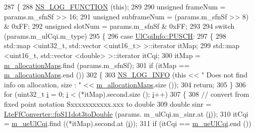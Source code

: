 \begin{DoxyCode}
287 \{
288   \hyperlink{log-macros-disabled_8h_a90b90d5bad1f39cb1b64923ea94c0761}{NS\_LOG\_FUNCTION} (\textcolor{keyword}{this});
289 
290         \textcolor{keywordtype}{unsigned} frameNum = params.m\_sfnSf >> 16;
291         \textcolor{keywordtype}{unsigned} subframeNum = (params.m\_sfnSf >> 8) & 0xFF;
292         \textcolor{keywordtype}{unsigned} slotNum = params.m\_sfnSf & 0xFF;
293 
294   \textcolor{keywordflow}{switch} (params.m\_ulCqi.m\_type)
295     \{
296     \textcolor{keywordflow}{case} \hyperlink{structns3_1_1UlCqiInfo_a8241de30e4fdc8640e892ddf1e2a6c00a6d4b515df7c45a6843584459fbde26a7}{UlCqiInfo::PUSCH}:
297       \{
298         std::map <uint32\_t, std::vector <uint16\_t> >::iterator itMap;
299         std::map <uint16\_t, std::vector <double> >::iterator itCqi;
300         itMap = \hyperlink{classns3_1_1MmWaveRrMacScheduler_aac1f8a8418e80a70a78e8fb710697588}{m\_allocationMaps}.find (params.m\_sfnSf);
301         \textcolor{keywordflow}{if} (itMap == \hyperlink{classns3_1_1MmWaveRrMacScheduler_aac1f8a8418e80a70a78e8fb710697588}{m\_allocationMaps}.end ())
302           \{
303             \hyperlink{group__logging_gafbd73ee2cf9f26b319f49086d8e860fb}{NS\_LOG\_INFO} (\textcolor{keyword}{this} << \textcolor{stringliteral}{" Does not find info on allocation, size : "} << 
      \hyperlink{classns3_1_1MmWaveRrMacScheduler_aac1f8a8418e80a70a78e8fb710697588}{m\_allocationMaps}.size ());
304             \textcolor{keywordflow}{return};
305           \}
306         \textcolor{keywordflow}{for} (uint32\_t \hyperlink{bernuolliDistribution_8m_a6f6ccfcf58b31cb6412107d9d5281426}{i} = 0; \hyperlink{bernuolliDistribution_8m_a6f6ccfcf58b31cb6412107d9d5281426}{i} < (*itMap).second.size (); \hyperlink{bernuolliDistribution_8m_a6f6ccfcf58b31cb6412107d9d5281426}{i}++)
307           \{
308             \textcolor{comment}{// convert from fixed point notation Sxxxxxxxxxxx.xxx to double}
309             \textcolor{keywordtype}{double} sinr = \hyperlink{classns3_1_1LteFfConverter_aa5d8c2a8f988dbd63da91818c18666eb}{LteFfConverter::fpS11dot3toDouble} (params.
      m\_ulCqi.m\_sinr.at (\hyperlink{bernuolliDistribution_8m_a6f6ccfcf58b31cb6412107d9d5281426}{i}));
310             itCqi = \hyperlink{classns3_1_1MmWaveRrMacScheduler_aeb890d54a9f369fe677a64efa78d2402}{m\_ueUlCqi}.find ((*itMap).second.at (\hyperlink{bernuolliDistribution_8m_a6f6ccfcf58b31cb6412107d9d5281426}{i}));
311             \textcolor{keywordflow}{if} (itCqi == \hyperlink{classns3_1_1MmWaveRrMacScheduler_aeb890d54a9f369fe677a64efa78d2402}{m\_ueUlCqi}.end ())

\end{DoxyCode}

